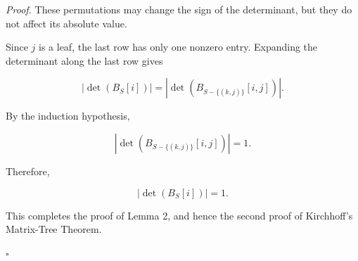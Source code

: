 \documentclass[
  a4paper,
  10pt]{article}
\newenvironment{proofbox}
  {\par\medskip\noindent\textit{Proof.}\quad}
  {\hfill$\square$\par\medskip}
\begin{document}
\begin{proofbox}
These permutations may change the sign of the determinant, but they do
not affect its absolute value.

Since \(j\) is a leaf, the last row has only one nonzero entry.
Expanding the determinant along the last row gives

\[
\left|\det(B_S[i])\right|
=
\left|
\det(B_{S-\{(k,j)\}}[i,j])
\right|.
\]

By the induction hypothesis,

\[
\left|
\det(B_{S-\{(k,j)\}}[i,j])
\right|
=1.
\]

Therefore,

\[
\left|\det(B_S[i])\right|=1.
\]

This completes the proof of Lemma 2, and hence the second proof of
Kirchhoff's Matrix-Tree Theorem.

\end{proofbox}
\end{document}
